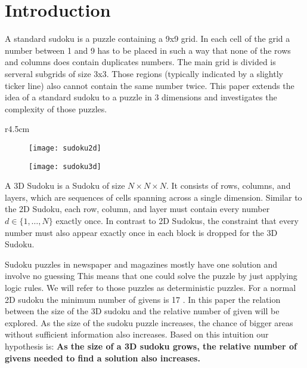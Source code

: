 \section{Introduction}
A standard sudoku is a puzzle containing a 9x9 grid. In each cell of the grid a number between 1 and 9 has to be placed in such a way that none of the rows and columns does contain duplicates numbers.
The main grid is divided is serveral subgrids of size 3x3. Those regions (typically indicated by a slightly ticker line) also cannot contain the same number twice. This paper extends the idea of a standard sudoku to a puzzle in 3 dimensions and investigates the complexity of those puzzles.

\begin{wrapfigure}{r}{4.5cm}

\begin{subfigure}[b]{0.55\textwidth}
   \texttt{[image: sudoku2d]}

   \label{fig:Ng1} 
\end{subfigure}

\begin{subfigure}[b]{0.55\textwidth}
\vspace{.2cm}
   \texttt{[image: sudoku3d]}

   \label{fig:Ng2}
\end{subfigure}

\end{wrapfigure} 

A 3D Sudoku is a Sudoku of size $N \times N \times N$. It consists of rows, columns, and layers, which are sequences of cells spanning across a single dimension. Similar to the 2D Sudoku, each row, column, and layer must contain every number $d \in \{1, \hdots, N\}$ exactly once. In contrast to 2D Sudokus, the constraint that every number must also appear exactly once in each block is dropped for the 3D Sudoku. 

Sudoku puzzles in newspaper and magazines mostly have one solution and involve no guessing This means that one could solve the puzzle by just applying logic rules. We will refer to those puzzles as deterministic puzzles. For a normal 2D sudoku the minimum number of givens is 17 \cite{sud16}. In this paper the relation between the size of the 3D sudoku and the relative number of given will be explored. As the size of the sudoku puzzle increases, the chance of bigger areas without sufficient information also increases. Based on this intuition our hypothesis is:  \textbf{As the size of a 3D sudoku grows, the relative number of givens needed to find a solution also increases.}